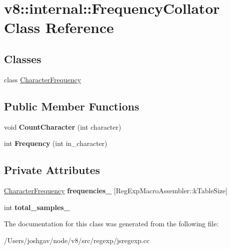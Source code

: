 \hypertarget{classv8_1_1internal_1_1_frequency_collator}{}\section{v8\+:\+:internal\+:\+:Frequency\+Collator Class Reference}
\label{classv8_1_1internal_1_1_frequency_collator}
\subsection*{Classes}
\begin{DoxyCompactItemize}
\item 
class \hyperlink{classv8_1_1internal_1_1_frequency_collator_1_1_character_frequency}{Character\+Frequency}
\end{DoxyCompactItemize}
\subsection*{Public Member Functions}
\begin{DoxyCompactItemize}
\item 
void {\bfseries Count\+Character} (int character)\hypertarget{classv8_1_1internal_1_1_frequency_collator_ade011457b027caad1d56d84de9c182ff}{}\label{classv8_1_1internal_1_1_frequency_collator_ade011457b027caad1d56d84de9c182ff}

\item 
int {\bfseries Frequency} (int in\+\_\+character)\hypertarget{classv8_1_1internal_1_1_frequency_collator_a30b9336ba6e9fc2a358408da97e5c107}{}\label{classv8_1_1internal_1_1_frequency_collator_a30b9336ba6e9fc2a358408da97e5c107}

\end{DoxyCompactItemize}
\subsection*{Private Attributes}
\begin{DoxyCompactItemize}
\item 
\hyperlink{classv8_1_1internal_1_1_frequency_collator_1_1_character_frequency}{Character\+Frequency} {\bfseries frequencies\+\_\+} \mbox{[}Reg\+Exp\+Macro\+Assembler\+::k\+Table\+Size\mbox{]}\hypertarget{classv8_1_1internal_1_1_frequency_collator_ad2fd08c55831541612965c232c3ee05e}{}\label{classv8_1_1internal_1_1_frequency_collator_ad2fd08c55831541612965c232c3ee05e}

\item 
int {\bfseries total\+\_\+samples\+\_\+}\hypertarget{classv8_1_1internal_1_1_frequency_collator_a662bc4d695d4497e5cca765f816db8fe}{}\label{classv8_1_1internal_1_1_frequency_collator_a662bc4d695d4497e5cca765f816db8fe}

\end{DoxyCompactItemize}


The documentation for this class was generated from the following file\+:\begin{DoxyCompactItemize}
\item 
/\+Users/joshgav/node/v8/src/regexp/jsregexp.\+cc\end{DoxyCompactItemize}
